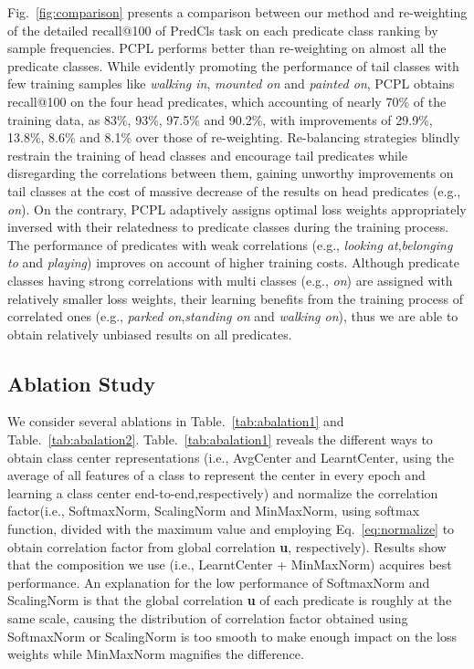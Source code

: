 \documentclass[sigconf]{acmart}
\begin{document}
Fig.~\ref{fig:comparison} presents a comparison between our method and re-weighting of the detailed recall@100 of PredCls task on each predicate class ranking by sample frequencies. PCPL performs better than re-weighting on almost all the predicate classes. While evidently promoting the performance of tail classes with few training samples like \emph{walking in}, \emph{mounted on} and \emph{painted on}, PCPL obtains recall@100 on the four head predicates, which accounting of nearly 70\% of the training data, as 83\%, 93\%, 97.5\% and 90.2\%, with improvements of 29.9\%, 13.8\%, 8.6\% and 8.1\% over those of re-weighting. Re-balancing strategies blindly restrain the training of head classes and encourage tail predicates while disregarding the correlations between them, gaining unworthy improvements on tail classes at the cost of massive decrease of the results on head predicates (e.g., \emph{on}). On the contrary, PCPL adaptively assigns optimal loss weights appropriately inversed with their relatedness to predicate classes during the training process. The performance of predicates with weak correlations (e.g., \emph{looking at},\emph{belonging to} and \emph{playing}) improves on account of higher training costs. Although predicate classes having strong correlations with multi classes (e.g., \emph{on}) are assigned with relatively smaller loss weights, their learning benefits from the training process of correlated ones (e.g., \emph{parked on},\emph{standing on} and \emph{walking on}), thus we are able to obtain relatively unbiased results on all predicates. 
\subsection{Ablation Study}
We consider several ablations in Table.~\ref{tab:abalation1} and Table.~\ref{tab:abalation2}. Table.~\ref{tab:abalation1} reveals the different ways to obtain class center representations (i.e., AvgCenter and LearntCenter, using the average of all features of a class to represent the center in every epoch and learning a class center end-to-end,respectively) and normalize the correlation factor(i.e., SoftmaxNorm, ScalingNorm and MinMaxNorm, using softmax function, divided with the maximum value and employing Eq.~\ref{eq:normalize} to obtain correlation factor  from global correlation \textbf{u}, respectively). Results show that the composition we use (i.e., LearntCenter + MinMaxNorm) acquires best performance. An explanation for the low performance of SoftmaxNorm and ScalingNorm is that the global correlation \textbf{u} of each predicate is roughly at the same scale, causing the distribution of correlation factor  obtained using SoftmaxNorm or ScalingNorm is too smooth to make enough impact on the loss weights while MinMaxNorm magnifies the difference.
\end{document}
